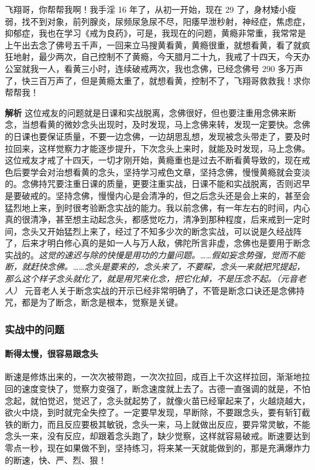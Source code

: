\begin{case}[练习过程中的问题]
    飞翔哥，你帮帮我啊！我手淫 16 年了，从初一开始，现在 29 了，身材矮小瘦弱，找不到对象，前列腺炎，尿频尿急尿不尽，阳痿早泄秒射，神经症，焦虑症，抑郁症，我也在学习《戒为良药》，可是，我现在的问题，黄瘾非常重，我常常是上午出去念了佛号五千声，一回来立马搜黄看黄，黄瘾很重，就想看黄，看了就疯狂地射，最少两次，自己控制不了黄瘾，今天腊月二十九，我戒了十四天，今天办公室就我一人，看黄三小时，连续破戒两次，我也念佛，已经念佛号 290 多万声了，快三百万声了，但是黄瘾太重了，就想看黄，控制不了，飞翔哥救救我！求你帮帮我！

    \textbf{解析} 这位戒友的问题就是日课和实战脱离，念佛很好，但也要注重用念佛来断念，当想看黄的微妙念头出现时，及时发现，马上念佛来转，发现一定要快。念佛的日课也要保证质量，不要一边念佛，一边胡思乱想，发现被念头带走了，要及时拉回来，这样觉察力才能逐步提升，下次念头上来时，就能及时发现，马上念佛。这位戒友才戒了十四天，一切才刚开始，黄瘾重也是过去不断看黄导致的，现在戒色后要学会对治想看黄的念头，坚持学习戒色文章，坚持念佛，慢慢黄瘾就会变淡的。念佛持咒要注重日课的质量，更要注重实战，日课不能和实战脱离，否则迟早是要破戒的。坚持念佛，慢慢内心是会清净的，但之后念头还是会上来的，甚至会猛烈地上来，到时很考验断念实战的能力。我以前念佛，有一年左右的时间，内心真的很清净，甚至想主动起念头，都感觉吃力，清净到那种程度，后来戒到一定时间，念头又开始猛烈上来了，经过了不知多少次的断念实战，可以说是久经战阵了，后来才明白修心真的是如一人与万人敌，佛陀所言非虚，念佛也是要用于断念实战的。\textit{这觉的速迟与除的快慢是用功的力量问题。……假如妄念势强，觉而不能断，就赶快念佛。……念头是要来的，念头来了，不要睬，念头一来就把咒提起，那么这个样子念头就化了，就是用咒来化念，把它化掉，不是压念不起。（元音老人）} 元音老人关于断念实战的开示已经非常明确了，不管是断念口诀还是念佛持咒，都是为了断念，断念是根本，觉察是关键。
\end{case}

\subsubsection{实战中的问题}

\paragraph{断得太慢，很容易跟念头}

断速是修炼出来的，一次次被带跑，一次次拉回，成百上千次这样拉回，渐渐地拉回的速度变快了，觉察力变强了，断念速度就上去了。古德一直强调的就是，不怕念起，就怕觉迟，觉迟了，念头就起势了，就像火苗已经窜起来了，火越烧越大，欲火中烧，到时就完全失控了。一定要早发现，早断除，不要跟念头，要有斩钉截铁的断力，而且反应要极其敏锐，念头一来，马上就做出反应，要异常灵敏，不能念头一来，没有反应，却跟着念头跑了，缺少觉察，这样就容易破戒。断速要达到零点一秒，现在如果做不到，坚持练习，将来某一天就能做到的，那是充满爆炸力的断速，快、严、烈、狠！

